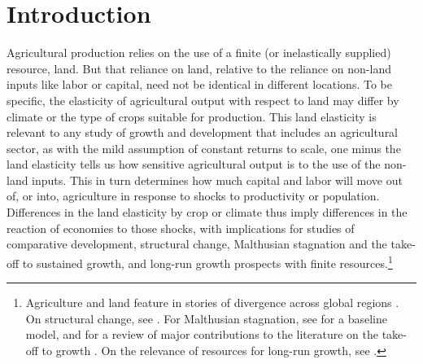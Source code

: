\documentclass[11pt]{article}
\begin{document}
\pagebreak 

\section{Introduction}
\onehalfspacing 
Agricultural production relies on the use of a finite (or inelastically supplied) resource, land. But that reliance on land, relative to the reliance on non-land inputs like labor or capital, need not be identical in different locations. To be specific, the elasticity of agricultural output with respect to land may differ by climate or the type of crops suitable for production. This land elasticity is relevant to any study of growth and development that includes an agricultural sector, as with the mild assumption of constant returns to scale, one minus the land elasticity tells us how sensitive agricultural output is to the use of the non-land inputs. This in turn determines how much capital and labor will move out of, or into, agriculture in response to shocks to productivity or population. Differences in the land elasticity by crop or climate thus imply differences in the reaction of economies to those shocks, with implications for studies of comparative development, structural change, Malthusian stagnation and the take-off to sustained growth, and long-run growth prospects with finite resources.\footnote{Agriculture and land feature in stories of divergence across global regions \citep{kp2001,galor2008trading,vollrath2011,vv08,vv13,cs2015}. On structural change, see \cite{Gollin:2007oq,Restuccia:2008hc,weilwilde2009,Gollin:2010ys,ev2016clim}. For Malthusian stagnation, see \cite{ashraf2010dynamics} for a baseline model, and \citet{Galor:2011uq} for a review of major contributions to the literature on the take-off to growth \citep{gw00,galor2002natural,Hansen:2002fk,doepke2004accounting,cs2005,lagerlof2006,craftsmills2009,strulik2008population}. On the relevance of resources for long-run growth, see \cite{perettovalente2015}.} 
\end{document}
